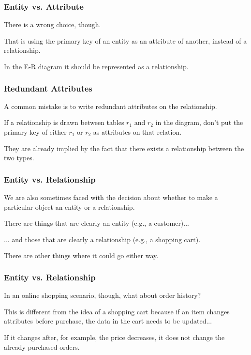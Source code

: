 \begin{frame}
\frametitle{Entity vs. Attribute}

There is a wrong choice, though. 

That is using the primary key of an entity as an attribute of another, instead of a relationship.

In the E-R diagram it should be represented as a relationship.

\end{frame}



\begin{frame}
\frametitle{Redundant Attributes}

A common mistake is to write redundant attributes on the relationship. 

If a relationship is drawn between tables $r_{1}$ and $r_{2}$ in the diagram, don't put the primary key of either $r_{1}$ or $r_{2}$ as attributes on that relation.

They are already implied by the fact that there exists a relationship between the two types. 

\end{frame}



\begin{frame}
\frametitle{Entity vs. Relationship}

We are also sometimes faced with the decision about whether to make a particular object an entity or a relationship. 

There are things that are clearly an entity (e.g., a customer)...

... and those that are clearly a relationship (e.g., a shopping cart).

There are other things where it could go either way. 

\end{frame}



\begin{frame}
\frametitle{Entity vs. Relationship}

In an online shopping scenario, though, what about order history? 

This is different from the idea of a shopping cart because if an item changes attributes before purchase, the data in the cart needs to be updated...

If it changes after, for example, the price decreases, it does not change the already-purchased orders.

\end{frame}



